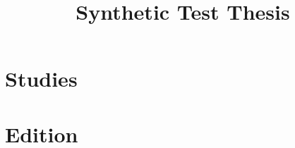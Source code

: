 \documentclass[12pt]{book}
\title{Synthetic Test Thesis}
\begin{document}
\maketitle

\part{Studies}


\part{Edition}



\printbibliography
\end{document}
